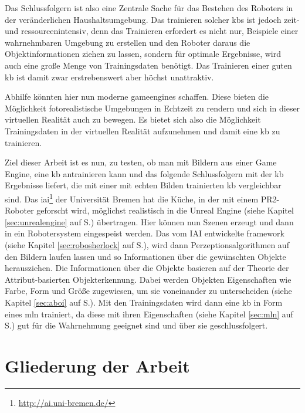 Das Schlussfolgern ist also eine Zentrale Sache für das Bestehen des Roboters in der veränderlichen Haushaltsumgebung. Das trainieren solcher \glspl{kb} ist jedoch zeit- und ressourcenintensiv, denn das Trainieren erfordert es nicht nur, Beispiele einer wahrnehmbaren Umgebung zu erstellen und den Roboter daraus die Objektinformationen ziehen zu lassen, sondern für optimale Ergebnisse, wird auch eine große Menge von Trainingsdaten benötigt. Das Trainieren  einer guten \gls{kb} ist damit zwar erstrebenswert aber höchst unattraktiv. \par      
Abhilfe könnten hier nun moderne \glspl{gameengine} schaffen. Diese bieten die Möglichkeit fotorealistische Umgebungen in Echtzeit zu rendern und sich in dieser virtuellen Realität auch zu bewegen. Es bietet sich also die Möglichkeit Trainingsdaten in der virtuellen Realität aufzunehmen und damit eine \gls{kb} zu trainieren. \par  
Ziel dieser Arbeit ist es nun, zu testen, ob man mit Bildern aus einer Game Engine, eine \gls{kb} antrainieren kann und das folgende Schlussfolgern mit der \gls{kb} Ergebnisse liefert, die mit einer mit echten Bilden trainierten \gls{kb} vergleichbar sind. Das \gls{iai}\footnote{\url{http://ai.uni-bremen.de/}} der Universität Bremen hat die Küche, in der mit einem PR2-Roboter geforscht wird, möglichst realistisch in die Unreal Engine (siehe Kapitel \ref{sec:unrealengine} auf S.\pageref{sec:unrealengine}) übertragen. Hier können nun Szenen erzeugt und dann in ein Robotersystem eingespeist werden. Das vom IAI entwickelte \gls{framework} \robosherlock (siehe Kapitel \ref{sec:robosherlock} auf S.\pageref{sec:robosherlock}), wird dann Perzeptionsalgorithmen auf den Bildern laufen lassen und so Informationen über die gewünschten Objekte herausziehen. Die Informationen über die Objekte basieren auf der Theorie der Attribut-basierten Objekterkennung. Dabei werden Objekten Eigenschaften wie Farbe, Form und Größe zugewiesen, um sie voneinander zu unterscheiden (siehe Kapitel \ref{sec:aboi} auf S.\pageref{sec:aboi}). Mit den Trainingsdaten wird dann eine \gls{kb} in Form eines \gls{mln}  trainiert, da diese mit ihren Eigenschaften (siehe Kapitel \ref{sec:mln} auf S.\pageref{sec:mln}) gut für die Wahrnehmung geeignet sind und über sie geschlussfolgert.  

\section{Gliederung der Arbeit}
\label{sec:gliederung}


   

